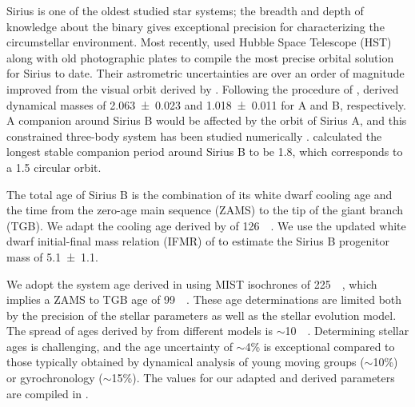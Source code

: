 \documentclass[twocolumn,linenumbers]{aastex631}
\begin{document}
Sirius is one of the oldest studied star systems; the breadth and depth of knowledge about the binary gives exceptional precision for characterizing the circumstellar environment. Most recently, \citet{bondSiriusSystemIts2017} used Hubble Space Telescope (HST) along with old photographic plates to compile the most precise orbital solution for Sirius to date. Their astrometric uncertainties are over an order of magnitude improved from the visual orbit derived by \citet{vandenbosOrbitSiriusADS1960}. Following the procedure of \citet{gatewoodStudySirius1978}, \citet{bondSiriusSystemIts2017} derived dynamical masses of \qty{2.063+-0.023}{\solarmass} and \qty{1.018+-0.011}{\solarmass} for A and B, respectively. A companion around Sirius B would be affected by the orbit of Sirius A, and this constrained three-body system has been studied numerically \citep{holmanLongTermStabilityPlanets1999}. \citet{bondSiriusSystemIts2017} calculated the longest stable companion period around Sirius B to be \qty{1.8}{\year}, which corresponds to a \qty{1.5}{\au} circular orbit.

The total age of Sirius B is the combination of its white dwarf cooling age and the time from the zero-age main sequence (ZAMS) to the tip of the giant branch (TGB). We adapt the cooling age derived by \citet[Sec.~8]{bondSiriusSystemIts2017} of \qty{126}{\mega\year}. We use the updated white dwarf initial-final mass relation (IFMR) of \citet{cummingsWhiteDwarfInitialFinal2018} to estimate the Sirius B progenitor mass of \qty{5.1\pm1.1}{\solarmass}.

We adopt the system age derived in \citet{cummingsWhiteDwarfInitialFinal2018} using MIST isochrones of \qty{225}{\mega\year}, which implies a ZAMS to TGB age of \qty{99}{\mega\year}. These age determinations are limited both by the precision of the stellar parameters as well as the stellar evolution model. The spread of ages derived by \citet{cummingsWhiteDwarfInitialFinal2018} from different models is $\sim$\qty{10}{\mega\year}. Determining stellar ages is challenging, and the age uncertainty of $\sim$4\% is exceptional compared to those typically obtained by dynamical analysis of young moving groups ($\sim$10\%) or gyrochronology ($\sim$15\%). The values for our adapted and derived parameters are compiled in .
\end{document}
